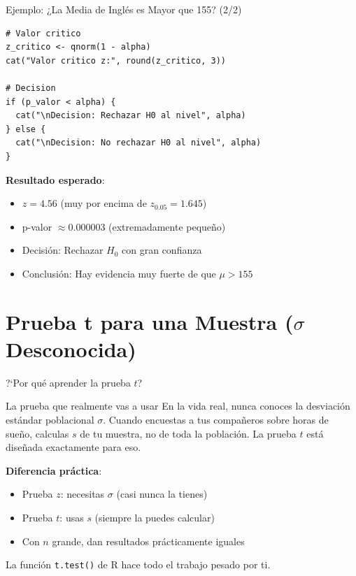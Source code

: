 \documentclass[aspectratio=169, 11pt]{beamer}
\begin{document}
\begin{frame}[fragile]{Ejemplo: ¿La Media de Inglés es Mayor que 155? (2/2)}
\begin{lstlisting}
# Valor critico
z_critico <- qnorm(1 - alpha)
cat("Valor critico z:", round(z_critico, 3))

# Decision
if (p_valor < alpha) {
  cat("\nDecision: Rechazar H0 al nivel", alpha)
} else {
  cat("\nDecision: No rechazar H0 al nivel", alpha)
}
\end{lstlisting}

\vspace{0.3cm}
\textbf{Resultado esperado}:
\begin{itemize}
  \item $z = 4.56$ (muy por encima de $z_{0.05} = 1.645$)
  \item p-valor $\approx 0.000003$ (extremadamente pequeño)
  \item Decisión: Rechazar $H_0$ con gran confianza
  \item Conclusión: Hay evidencia muy fuerte de que $\mu > 155$
\end{itemize}
\end{frame}

\section{Prueba t para una Muestra ($\sigma$ Desconocida)}

\begin{frame}{?`Por qu\'e aprender la prueba $t$?}
\small
\begin{exampleblock}{La prueba que realmente vas a usar}
En la vida real, \alert{nunca} conoces la desviaci\'on est\'andar poblacional $\sigma$. Cuando encuestas a tus compa\~neros sobre horas de sue\~no, calculas $s$ de tu muestra, no de toda la poblaci\'on. La prueba $t$ est\'a dise\~nada exactamente para eso.
\end{exampleblock}

\vspace{0.2cm}
\textbf{Diferencia pr\'actica}:
\begin{itemize}\setlength{\itemsep}{1pt}
  \item Prueba $z$: necesitas $\sigma$ (casi nunca la tienes)
  \item Prueba $t$: usas $s$ (siempre la puedes calcular)
  \item Con $n$ grande, dan resultados pr\'acticamente iguales
\end{itemize}

\vspace{0.1cm}
La funci\'on \texttt{t.test()} de R hace todo el trabajo pesado por ti.
\end{frame}
\end{document}
